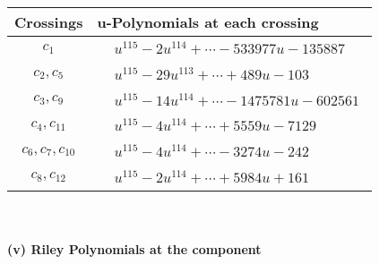 \documentclass[1p]{elsarticle_modified}
\theoremstyle{definition}
\begin{document}
\begin{tabular}{m{50pt}|m{274pt}}
Crossings & \hspace{64pt}u-Polynomials at each crossing \\
\hline $$\begin{aligned}c_{1}\end{aligned}$$&$\begin{aligned}
&u^{115}-2 u^{114}+\cdots-533977 u-135887
\end{aligned}$\\
\hline $$\begin{aligned}c_{2},c_{5}\end{aligned}$$&$\begin{aligned}
&u^{115}-29 u^{113}+\cdots+489 u-103
\end{aligned}$\\
\hline $$\begin{aligned}c_{3},c_{9}\end{aligned}$$&$\begin{aligned}
&u^{115}-14 u^{114}+\cdots-1475781 u-602561
\end{aligned}$\\
\hline $$\begin{aligned}c_{4},c_{11}\end{aligned}$$&$\begin{aligned}
&u^{115}-4 u^{114}+\cdots+5559 u-7129
\end{aligned}$\\
\hline $$\begin{aligned}c_{6},c_{7},c_{10}\end{aligned}$$&$\begin{aligned}
&u^{115}-4 u^{114}+\cdots-3274 u-242
\end{aligned}$\\
\hline $$\begin{aligned}c_{8},c_{12}\end{aligned}$$&$\begin{aligned}
&u^{115}-2 u^{114}+\cdots+5984 u+161
\end{aligned}$\\
\hline
\end{tabular}\\~\\
\newpage\renewcommand{\arraystretch}{1}
\flushleft \textbf{(v) Riley Polynomials at the component}\newline \\
\end{document}
